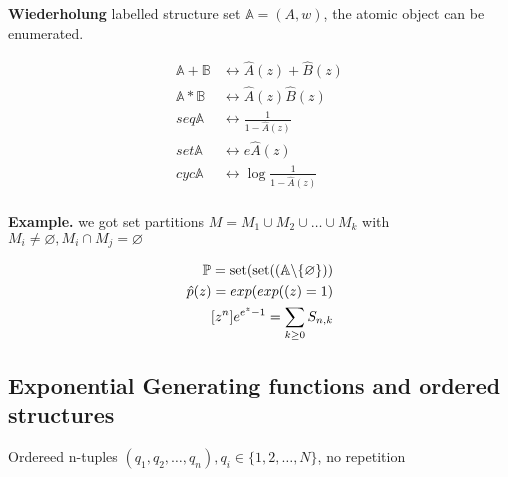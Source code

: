 


\textbf{Wiederholung}
labelled structure set $\mathbb{A} = (A,w)$, the atomic object can be enumerated. 

\begin{align*}
  \mathbb{A}+\mathbb{B} &\leftrightarrow \hat{A}(z) + \hat{B}(z) \\
  \mathbb{A}*\mathbb{B} &\leftrightarrow \hat{A}(z) \hat{B}(z) \\
  seq \mathbb{A} &\leftrightarrow \frac{1}{1 - \hat{A}(z)}\\
  set \mathbb{A} &\leftrightarrow e \hat{A}(z) \\
  cyc \mathbb{A} &\leftrightarrow \log \frac{1}{1 - \hat{A}(z)}\\
\end{align*}



\textbf{Example.}
we got set partitions $M = M_1 \cup M_2 \cup \ldots \cup M_k$ with $M_i \neq \varnothing, M_i \cap M_j = \varnothing$

\begin{align*}
  \mathbb{P} = \operatorname{set}( \operatorname{set}( (\mathbb{A} \backslash \{\varnothing\} )) \\
  \hat{p}(z) = exp(exp((z) = 1) \\
  [z^n] e^{e^z - 1} = \sum_{k\geq 0 } S_{n,k} \\
\end{align*}

\subsection{Exponential Generating functions and ordered structures}

Ordereed n-tuples $(q_1,q_2, \ldots, q_n), q_i \in \{1,2, \ldots, N\}$, no repetition

